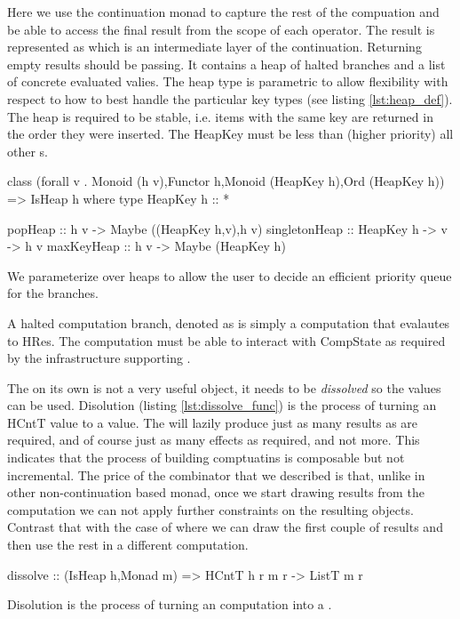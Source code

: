 Here we use the continuation monad to capture the rest of the
compuation and be able to access the final result from the scope of
each operator. The result is represented as  which is an
intermediate layer of the continuation. Returning empty results should
be passing. It contains a heap of halted branches and a list of
concrete evaluated valies. The heap type is parametric to allow
flexibility with respect to how to best handle the particular key
types (see listing \ref{lst:heap_def}). The heap is required to be stable,
i.e. items with the same key are returned in the order they were
inserted. The HeapKey  must be less than (higher priority) all
other  s.

\begin{code}
\begin{haskellcode}
class (forall v . Monoid (h v),Functor h,Monoid (HeapKey h),Ord (HeapKey h))
  => IsHeap h where
  type HeapKey h :: *

  popHeap :: h v -> Maybe ((HeapKey h,v),h v)
  singletonHeap :: HeapKey h -> v -> h v
  maxKeyHeap :: h v -> Maybe (HeapKey h)
\end{haskellcode}
\label{lst:heap_def}
  \caption{We parameterize over heaps to allow the
    user to decide an efficient priority queue for the branches.}
\end{code}

A halted computation branch, denoted as  is simply a
computation that evalautes to HRes. The computation must be able to
interact with CompState as required by the infrastructure supporting
\hask{<//>}.

The  on its own is not a very useful object, it needs to
be \emph{dissolved} so the values can be used. Disolution (listing
\ref{lst:dissolve_func}) is the process of turning an HCntT value to a
 value. The  will lazily produce just as many
results as are required, and of course just as many effects as
required, and not more. This indicates that the process of building
comptuatins is composable but not incremental. The price of the
\hask{<//>} combinator that we described is that, unlike in other
non-continuation based monad, once we start drawing results from the
computation we can not apply further constraints on the resulting
objects. Contrast that with the case of  where we can draw
the first couple of results and then use the rest in a different
computation.

\begin{code}
\begin{haskellcode}
dissolve :: (IsHeap h,Monad m) => HCntT h r m r -> ListT m r
\end{haskellcode}
  \caption{\label{lst:dissolve_func}Disolution is the process of
    turning an  computation into a .}
\end{code}

